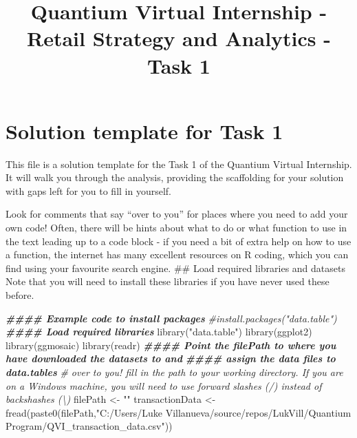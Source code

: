 \documentclass[
]{article}
\title{Quantium Virtual Internship - Retail Strategy and Analytics -
Task 1}
\author{}
\date{\vspace{-2.5em}}
\newenvironment{Shaded}{\begin{snugshade}}{\end{snugshade}}
\newcommand{\CommentTok}[1]{\textcolor[rgb]{0.56,0.35,0.01}{\textit{#1}}}
\newcommand{\DocumentationTok}[1]{\textcolor[rgb]{0.56,0.35,0.01}{\textbf{\textit{#1}}}}
\newcommand{\FunctionTok}[1]{\textcolor[rgb]{0.00,0.00,0.00}{#1}}
\newcommand{\NormalTok}[1]{#1}
\newcommand{\OtherTok}[1]{\textcolor[rgb]{0.56,0.35,0.01}{#1}}
\newcommand{\StringTok}[1]{\textcolor[rgb]{0.31,0.60,0.02}{#1}}
\begin{document}
\maketitle

\hypertarget{solution-template-for-task-1}{%
\section{Solution template for Task
1}\label{solution-template-for-task-1}}

This file is a solution template for the Task 1 of the Quantium Virtual
Internship. It will walk you through the analysis, providing the
scaffolding for your solution with gaps left for you to fill in
yourself.

Look for comments that say ``over to you'' for places where you need to
add your own code! Often, there will be hints about what to do or what
function to use in the text leading up to a code block - if you need a
bit of extra help on how to use a function, the internet has many
excellent resources on R coding, which you can find using your favourite
search engine. \#\# Load required libraries and datasets Note that you
will need to install these libraries if you have never used these
before.

\begin{Shaded}
\begin{Highlighting}[]
\DocumentationTok{\#\#\#\# Example code to install packages}
\CommentTok{\#install.packages("data.table")}
\DocumentationTok{\#\#\#\# Load required libraries}
\FunctionTok{library}\NormalTok{(}\StringTok{"data.table"}\NormalTok{)}
\FunctionTok{library}\NormalTok{(ggplot2)}
\FunctionTok{library}\NormalTok{(ggmosaic)}
\FunctionTok{library}\NormalTok{(readr)}
\DocumentationTok{\#\#\#\# Point the filePath to where you have downloaded the datasets to and }
\DocumentationTok{\#\#\#\# assign the data files to data.tables}
\CommentTok{\# over to you! fill in the path to your working directory. If you are on a Windows machine, you will need to use forward slashes (/) instead of backshashes (\textbackslash{})}
\NormalTok{filePath }\OtherTok{\textless{}{-}} \StringTok{""}
\NormalTok{transactionData }\OtherTok{\textless{}{-}} \FunctionTok{fread}\NormalTok{(}\FunctionTok{paste0}\NormalTok{(filePath,}\StringTok{"C:/Users/Luke Villanueva/source/repos/LukVill/Quantium Program/QVI\_transaction\_data.csv"}\NormalTok{))}
\end{Highlighting}
\end{Shaded}
\end{document}
